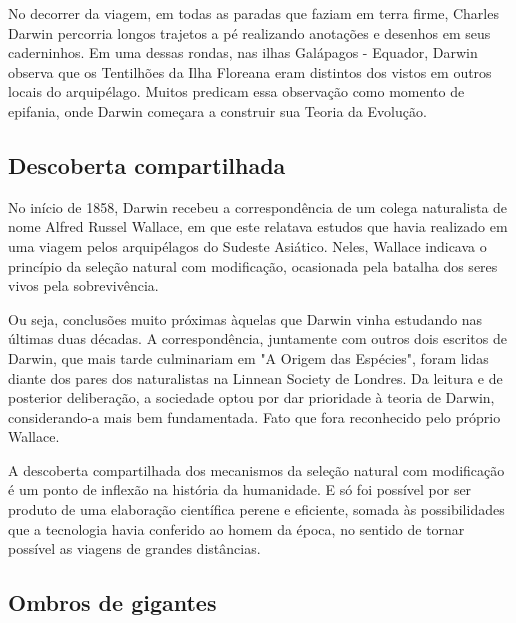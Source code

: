 \documentclass[12pt]{extarticle}
\begin{document}


No decorrer da viagem, em todas as paradas que faziam em terra firme,
Charles Darwin percorria longos trajetos a pé realizando anotações e
desenhos em seus caderninhos. Em uma dessas rondas, nas ilhas Galápagos
- Equador, Darwin observa que os Tentilhões da Ilha Floreana eram
distintos dos vistos em outros locais do arquipélago. Muitos predicam
essa observação como momento de epifania, onde Darwin começara a
construir sua Teoria da Evolução.

\subsection{Descoberta compartilhada}

No início de 1858, Darwin recebeu a correspondência de um colega
naturalista de nome Alfred Russel Wallace, em que este relatava estudos
que havia realizado em uma viagem pelos arquipélagos do Sudeste
Asiático. Neles, Wallace indicava o princípio da seleção natural com
modificação, ocasionada pela batalha dos seres vivos pela sobrevivência.

Ou seja, conclusões muito próximas àquelas que Darwin vinha estudando
nas últimas duas décadas. A correspondência, juntamente com outros dois
escritos de Darwin, que mais tarde culminariam em "A Origem das
Espécies", foram lidas diante dos pares dos naturalistas na Linnean
Society de Londres. Da leitura e de posterior deliberação, a sociedade
optou por dar prioridade à teoria de Darwin, considerando-a mais bem
fundamentada. Fato que fora reconhecido pelo próprio Wallace.




A descoberta compartilhada dos mecanismos da seleção natural com
modificação é um ponto de inflexão na história da humanidade. E só foi
possível por ser produto de uma elaboração científica perene e
eficiente, somada às possibilidades que a tecnologia havia conferido ao
homem da época, no sentido de tornar possível as viagens de grandes
distâncias.




\subsection{Ombros de gigantes}
\end{document}
